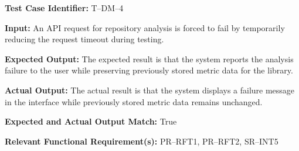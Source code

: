 \documentclass[12pt, titlepage]{article}
\begin{document}
\begin{mdframed}[linewidth=0.5mm]
\setlength{\parindent}{0pt}
\textbf{Test Case Identifier:} T--DM--4
\vspace{0.4em}

\textbf{Input:} An API request for repository analysis is forced to fail by temporarily reducing the request timeout during testing.
\vspace{0.4em}

\textbf{Expected Output:} The expected result is that the system reports the analysis failure to the user while preserving previously stored metric data for the library.
\vspace{0.4em}

\textbf{Actual Output:} The actual result is that the system displays a failure message in the interface while previously stored metric data remains unchanged.
\vspace{0.4em}

\textbf{Expected and Actual Output Match:} True
\vspace{0.4em}

\textbf{Relevant Functional Requirement(s):} PR--RFT1, PR--RFT2, SR--INT5
\end{mdframed}
\end{document}
